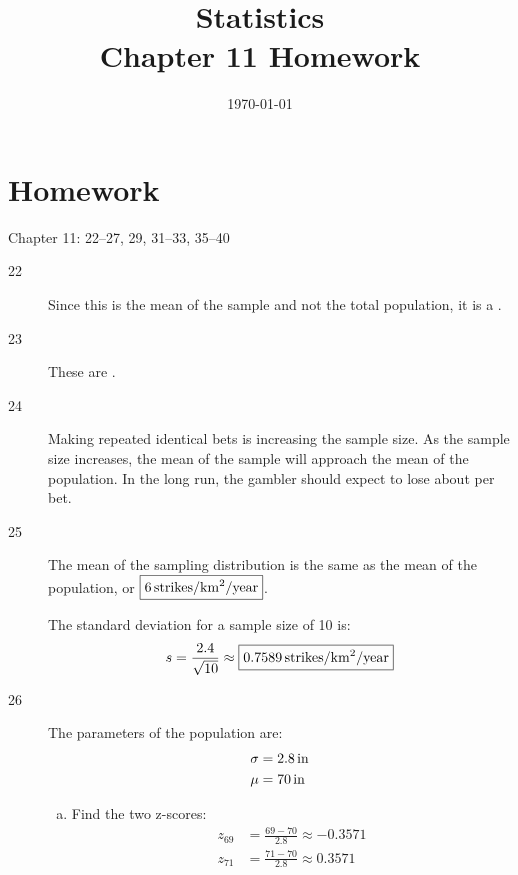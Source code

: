 \documentclass[letterpaper, landscape]{exam}
\title{Statistics \\ Chapter 11 Homework}
\date{\today}
\author{}
\newcommand{\cent}{\textcent\xspace}
\begin{document}
  \maketitle

  \section{Homework}
  Chapter 11: 22--27, 29, 31--33, 35--40

  \ifprintanswers{}
    \begin{description}

      \item[22] Since this is the mean of the sample and not the total
        population, it is a .

      \item[23] These are .

      \item[24] Making repeated identical bets is increasing the sample size.
        As the sample size increases, the mean of the sample will approach the
        mean of the population. In the long run, the gambler should expect to
        lose about \fbox{ 5.3\cent{} } per bet.

      \item[25] The mean of the sampling distribution is the same as the mean of
        the population, or $\boxed{ \unit[6]{strikes/km^2/year} }$.

        The standard deviation for a sample size of 10 is:
        \[
          s = \frac{2.4}{\sqrt{10}} \approx \boxed{ \unit[0.7589]{strikes/km^2/year} }
        \]

      \item[26]
        The parameters of the population are:
        \begin{align*}
          \sigma & = \unit[2.8]{in} \\
          \mu    & = \unit[70]{in} \\
        \end{align*}

        \begin{enumerate}[(a)]
          \item Find the two z-scores:
            \begin{align*}
              z_{69} &= \frac{69 - 70}{2.8} \approx -0.3571 \\
              z_{71} &= \frac{71 - 70}{2.8} \approx 0.3571 \\
            \end{align*}


\end{enumerate}
\end{description}
\end{document}
